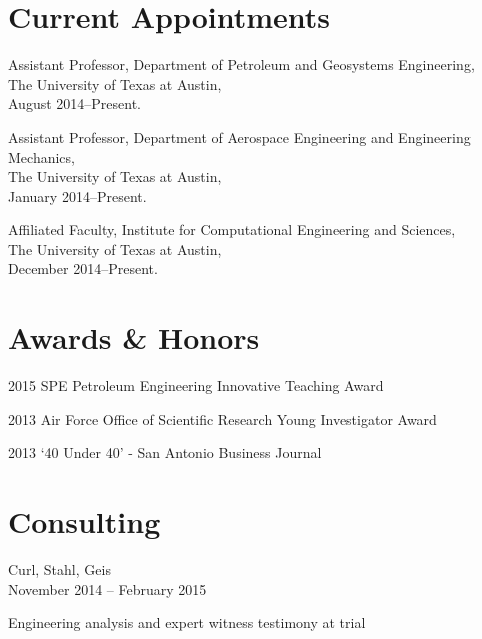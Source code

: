 \documentclass[12pt,letterpaper]{article}
\renewenvironment{itemize}{
  \begin{list}{}{
    \setlength{\leftmargin}{1.5em}
    \setlength{\itemsep}{0.25em}
    \setlength{\parskip}{0pt}
    \setlength{\parsep}{0.25em}
  }
}{
  \end{list}
}
\begin{document}
\section*{Current Appointments}

\begin{itemize}
    \item Assistant Professor, Department of Petroleum and Geosystems Engineering, \\ 
          The University of Texas at Austin, \\
          August 2014--Present. 

      \item Assistant Professor, Department of Aerospace Engineering and Engineering Mechanics, \\ 
          The University of Texas at Austin, \\
          January 2014--Present. 

    \item Affiliated Faculty, Institute for Computational Engineering and Sciences, \\ 
          The University of Texas at Austin, \\
          December 2014--Present. 
\end{itemize}
\fi

\section*{Awards \& Honors}

\begin{itemize}
    \item 2015 SPE Petroleum Engineering Innovative Teaching Award 
    \item 2013 Air Force Office of Scientific Research Young Investigator Award
    \item 2013 `40 Under 40' - San Antonio Business Journal
\end{itemize}


\section*{Consulting}

\begin{itemize}
    \item Curl, Stahl, Geis \\
          November 2014 -- February 2015
    \begin{itemize}
        \item Engineering analysis and expert witness testimony at trial
    \end{itemize}
\end{itemize}
\end{document}
